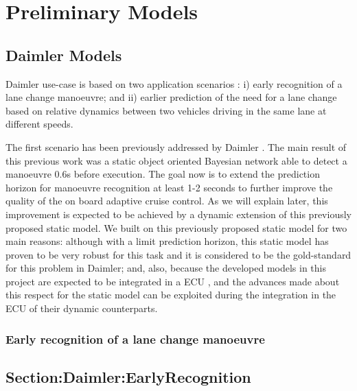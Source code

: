 \section{Preliminary Models}
\subsection{Daimler Models}


Daimler use-case is based on two application scenarios \cite{Fer14}: i) early recognition of a lane change manoeuvre; and ii) earlier prediction of the need for a lane change based on relative dynamics between two vehicles driving in the same lane at different speeds. 

The first scenario has been previously addressed by Daimler \cite{kasper2012object}. The main result of this previous work was a static object oriented Bayesian network \cite{koller1997object} able to detect a manoeuvre 0.6s before execution. The goal now is to extend the prediction horizon for manoeuvre recognition at least 1-2 seconds to further improve the quality of the on board adaptive cruise control. As we will explain later, this improvement is expected to be achieved by a dynamic extension of this previously proposed static model. We built on this previously proposed static model for two main reasons: although with a limit prediction horizon, this static model has proven to be very robust for this task and it is considered to be the gold-standard for this problem in Daimler; and, also, because the developed models in this project are expected to be integrated in a ECU \cite{Fer14}, and the advances made about this respect for the static model \cite{Weidl2014} can be exploited during the integration in the ECU of their dynamic counterparts. 



\subsubsection{Early recognition of a lane change manoeuvre}
\subsection{Section:Daimler:EarlyRecognition}

